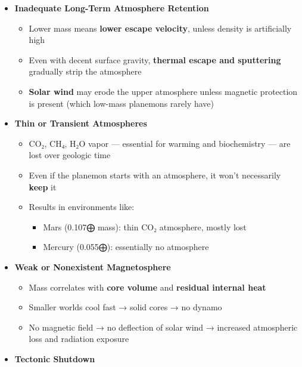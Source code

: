 \documentclass[
  letterpaper,
]{book}
\providecommand{\tightlist}{%
  \setlength{\itemsep}{0pt}\setlength{\parskip}{0pt}}
\begin{document}
\begin{itemize}
\tightlist
\item
  \textbf{Inadequate Long-Term Atmosphere Retention}

  \begin{itemize}
  \tightlist
  \item
    Lower mass means \textbf{lower escape velocity}, unless density is
    artificially high\\
  \item
    Even with decent surface gravity, \textbf{thermal escape and
    sputtering} gradually strip the atmosphere
  \item
    \textbf{Solar wind} may erode the upper atmosphere unless magnetic
    protection is present (which low-mass planemons rarely have)
  \end{itemize}
\item
  \textbf{Thin or Transient Atmospheres}

  \begin{itemize}
  \tightlist
  \item
    CO₂, CH₄, H₂O vapor --- essential for warming and biochemistry ---
    are lost over geologic time
  \item
    Even if the planemon starts with an atmosphere, it won't necessarily
    \textbf{keep} it
  \item
    Results in environments like:

    \begin{itemize}
    \tightlist
    \item
      Mars (0.107⨁ mass): thin CO₂ atmosphere, mostly lost
    \item
      Mercury (0.055⨁): essentially no atmosphere
    \end{itemize}
  \end{itemize}
\item
  \textbf{Weak or Nonexistent Magnetosphere}

  \begin{itemize}
  \tightlist
  \item
    Mass correlates with \textbf{core volume} and \textbf{residual
    internal heat}
  \item
    Smaller worlds cool fast → solid cores → no dynamo
  \item
    No magnetic field → no deflection of solar wind → increased
    atmospheric loss and radiation exposure
  \end{itemize}
\item
  \textbf{Tectonic Shutdown}


\end{itemize}
\end{document}
